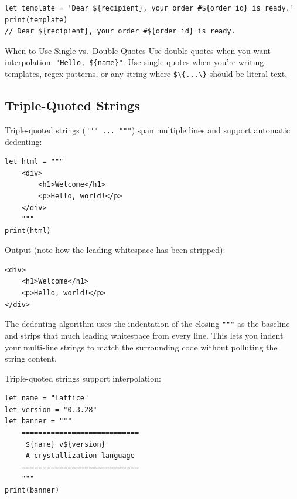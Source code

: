 \begin{lstlisting}[language=Lattice, caption={Single-quoted strings for templates}]
let template = 'Dear ${recipient}, your order #${order_id} is ready.'
print(template)
// Dear ${recipient}, your order #${order_id} is ready.
\end{lstlisting}

\begin{tipbox}{When to Use Single vs.\ Double Quotes}
Use double quotes when you want interpolation: \lstinline|"Hello, ${name}"|.
Use single quotes when you're writing templates, regex patterns, or any string where \lstinline|$\{...\}| should be literal text.
\end{tipbox}

\subsection{Triple-Quoted Strings}\label{subsec:triple-strings}

Triple-quoted strings (\lstinline|""" ... """|) span multiple lines and support automatic dedenting:

\begin{lstlisting}[language=Lattice, caption={Triple-quoted strings}]
let html = """
    <div>
        <h1>Welcome</h1>
        <p>Hello, world!</p>
    </div>
    """
print(html)
\end{lstlisting}

Output (note how the leading whitespace has been stripped):

\begin{lstlisting}[numbers=none]
<div>
    <h1>Welcome</h1>
    <p>Hello, world!</p>
</div>
\end{lstlisting}

The dedenting algorithm uses the indentation of the closing \lstinline|"""| as the baseline and strips that much leading whitespace from every line.
This lets you indent your multi-line strings to match the surrounding code without polluting the string content.

Triple-quoted strings support interpolation:

\begin{lstlisting}[language=Lattice, caption={Triple-quoted strings with interpolation}]
let name = "Lattice"
let version = "0.3.28"
let banner = """
    ============================
     ${name} v${version}
     A crystallization language
    ============================
    """
print(banner)
\end{lstlisting}


